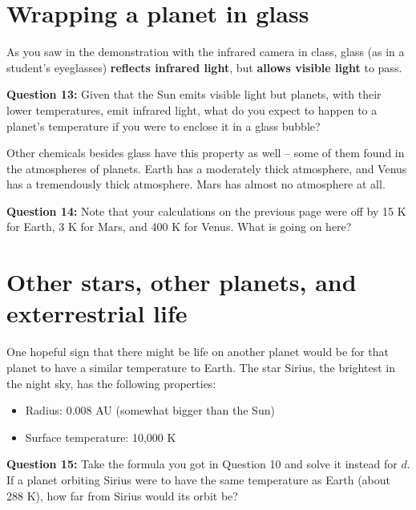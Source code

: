\documentclass[11pt]{article}
\def\BI{\begin{itemize}}
\def\EI{\end{itemize}}
\begin{document}
\section*{Wrapping a planet in glass}

As you saw in the demonstration with the infrared camera in class, glass (as in a student's eyeglasses) {\bf reflects infrared light}, but {\bf allows visible light} to pass.

{\bf Question 13:} 
Given that the Sun emits visible light but planets, with their lower temperatures, emit infrared light, what do you expect to happen to a planet's temperature if you were to
enclose it in a glass bubble? 

\vspace{1.5in}
\hrulefill
\bigskip

Other chemicals besides glass have this property as well -- some of them found in the atmospheres of planets. Earth has a moderately thick atmosphere, and Venus has a tremendously thick
atmosphere. Mars has almost no atmosphere at all.

{\bf Question 14:}  Note that your calculations on the previous page were off by 15 K for Earth, 3 K for Mars, and 400 K for Venus. 
What is going on here? 

\vspace{1.8in}
\hrulefill
\bigskip


\newpage
\section*{Other stars, other planets, and exterrestrial life}

One hopeful sign that there might be life on another planet would be for that planet to have a similar temperature to Earth. The star Sirius, the brightest in the night sky, 
has the following properties:

\BI
\item Radius: 0.008 AU (somewhat bigger than the Sun)
\item Surface temperature: 10,000 K
\EI

{\bf Question 15:} Take the formula you got in Question 10 and solve it instead for $d$. If a planet orbiting Sirius were to have the same temperature as Earth (about 288 K), 
how far from Sirius would its orbit be?
\end{document}
